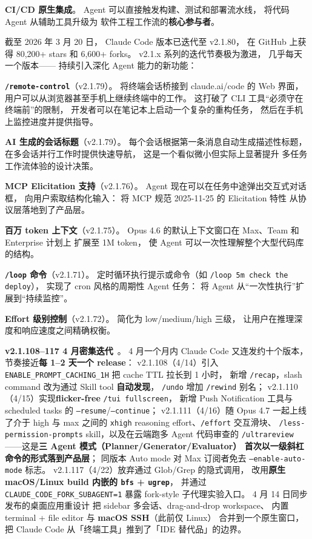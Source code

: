 \textbf{CI/CD 原生集成}。
Agent 可以直接触发构建、测试和部署流水线，
将代码 Agent 从辅助工具升级为
软件工程工作流的\textbf{核心参与者}。

截至 2026 年 3 月 20 日，
Claude Code 版本已迭代至 v2.1.80，
在 GitHub 上获得 80,200+ stars 和 6,600+ forks。
v2.1.x 系列的迭代节奏极为激进，
几乎每天一个版本——
持续引入深化 Agent 能力的新功能：

\textbf{\texttt{/remote-control}}（v2.1.79）。
将终端会话桥接到 claude.ai/code 的 Web 界面，
用户可以从浏览器甚至手机上继续终端中的工作。
这打破了 CLI 工具“必须守在终端前”的限制，
开发者可以在笔记本上启动一个复杂的重构任务，
然后在手机上监控进度并提供指导。

\textbf{AI 生成的会话标题}（v2.1.79）。
每个会话根据第一条消息自动生成描述性标题，
在多会话并行工作时提供快速导航，
这是一个看似微小但实际上显著提升
多任务工作流体验的设计决策。

\textbf{MCP Elicitation 支持}（v2.1.76）。
Agent 现在可以在任务中途弹出交互式对话框，
向用户索取结构化输入：
将 MCP 规范 2025-11-25 的 Elicitation 特性
从协议层落地到了产品层。

\textbf{百万 token 上下文}（v2.1.75）。
Opus 4.6 的默认上下文窗口在 Max、Team 和 Enterprise 计划上
扩展至 1M token，
使 Agent 可以一次性理解整个大型代码库的结构。

\textbf{\texttt{/loop} 命令}（v2.1.71）。
定时循环执行提示或命令（如 \texttt{/loop 5m check the deploy}），
实现了 cron 风格的周期性 Agent 任务：
将 Agent 从“一次性执行”扩展到“持续监控”。

\textbf{Effort 级别控制}（v2.1.72）。
简化为 low/medium/high 三级，
让用户在推理深度和响应速度之间精确权衡。

\textbf{v2.1.108--117 4 月密集迭代}~\cite{claudecodev21x}。
4 月一个月内 Claude Code 又连发约十个版本，
节奏接近\textbf{每 1--2 天一个 release}：
v2.1.108（4/14）引入 \texttt{ENABLE\_PROMPT\_CACHING\_1H} 把 cache TTL 拉长到 1 小时，
新增 \texttt{/recap}，slash command 改为通过 Skill tool \textbf{自动发现}，
\texttt{/undo} 增加 \texttt{/rewind} 别名；
v2.1.110（4/15）实现\textbf{flicker-free} \texttt{/tui fullscreen}，
新增 Push Notification 工具与 scheduled tasks 的 \texttt{--resume}/\texttt{--continue}；
v2.1.111（4/16）随 Opus 4.7 一起上线了介于 high 与 max 之间的
\texttt{xhigh} reasoning effort、\texttt{/effort} 交互滑块、
\texttt{/less-permission-prompts} skill，以及在云端跑多 Agent 代码审查的
\texttt{/ultrareview}——这是\textbf{三 Agent 模式（Planner/Generator/Evaluator）
首次以一级斜杠命令的形式落到产品层}；
同版本 Auto mode 对 Max 订阅者免去 \texttt{--enable-auto-mode} 标志。
v2.1.117（4/22）放弃通过 Glob/Grep 的隐式调用，
改用\textbf{原生 macOS/Linux build 内嵌的 \texttt{bfs} + \texttt{ugrep}}，
并通过 \texttt{CLAUDE\_CODE\_FORK\_SUBAGENT=1} 暴露 fork-style 子代理实验入口。
4 月 14 日同步发布的桌面应用重设计
把 sidebar 多会话、drag-and-drop workspace、
内置 terminal + file editor 与 \textbf{macOS SSH}（此前仅 Linux）
合并到一个原生窗口，把 Claude Code 从「终端工具」推到了「IDE 替代品」的边界。

